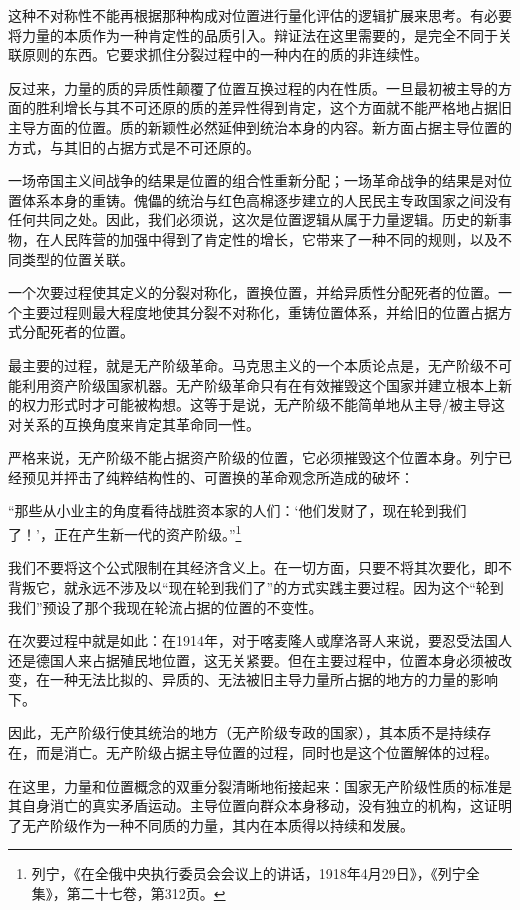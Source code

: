 \documentclass[fontset=fandol, a4paper, 12pt, twoside]{ctexart}
\renewenvironment{quote}
  {\list{}{\rightmargin=0cm \leftmargin=2em}%
   \item\relax\small\kaishu\color{black}}
  {\endlist}
\begin{document}
这种不对称性不能再根据那种构成对位置进行量化评估的逻辑扩展来思考。有必要将力量的本质作为一种肯定性的品质引入。辩证法在这里需要的，是完全不同于关联原则的东西。它要求抓住分裂过程中的一种内在的质的非连续性。

反过来，力量的质的异质性颠覆了位置互换过程的内在性质。一旦最初被主导的方面的胜利增长与其不可还原的质的差异性得到肯定，这个方面就不能严格地占据旧主导方面的位置。质的新颖性必然延伸到统治本身的内容。新方面占据主导位置的方式，与其旧的占据方式是不可还原的。

一场帝国主义间战争的结果是位置的组合性重新分配；一场革命战争的结果是对位置体系本身的重铸。傀儡的统治与红色高棉逐步建立的人民民主专政国家之间没有任何共同之处。因此，我们必须说，这次是位置逻辑从属于力量逻辑。历史的新事物，在人民阵营的加强中得到了肯定性的增长，它带来了一种不同的规则，以及不同类型的位置关联。

一个次要过程使其定义的分裂对称化，置换位置，并给异质性分配死者的位置。一个主要过程则最大程度地使其分裂不对称化，重铸位置体系，并给旧的位置占据方式分配死者的位置。

最主要的过程，就是无产阶级革命。马克思主义的一个本质论点是，无产阶级不可能利用资产阶级国家机器。无产阶级革命只有在有效摧毁这个国家并建立根本上新的权力形式时才可能被构想。这等于是说，无产阶级不能简单地从主导/被主导这对关系的互换角度来肯定其革命同一性。

严格来说，无产阶级不能占据资产阶级的位置，它必须摧毁这个位置本身。列宁已经预见并抨击了纯粹结构性的、可置换的革命观念所造成的破坏：

\begin{quote}
“那些从小业主的角度看待战胜资本家的人们：‘他们发财了，现在轮到我们了！’，正在产生新一代的资产阶级。”\footnote{列宁，《在全俄中央执行委员会会议上的讲话，1918年4月29日》，《列宁全集》，第二十七卷，第312页。}
\end{quote}

我们不要将这个公式限制在其经济含义上。在一切方面，只要不将其次要化，即不背叛它，就永远不涉及以“现在轮到我们了”的方式实践主要过程。因为这个“轮到我们”预设了那个我现在轮流占据的位置的不变性。

在次要过程中就是如此：在1914年，对于喀麦隆人或摩洛哥人来说，要忍受法国人还是德国人来占据殖民地位置，这无关紧要。但在主要过程中，位置本身必须被改变，在一种无法比拟的、异质的、无法被旧主导力量所占据的地方的力量的影响下。

因此，无产阶级行使其统治的地方（无产阶级专政的国家），其本质不是持续存在，而是消亡。无产阶级占据主导位置的过程，同时也是这个位置解体的过程。

在这里，力量和位置概念的双重分裂清晰地衔接起来：国家无产阶级性质的标准是其自身消亡的真实矛盾运动。主导位置向群众本身移动，没有独立的机构，这证明了无产阶级作为一种不同质的力量，其内在本质得以持续和发展。
\end{document}
